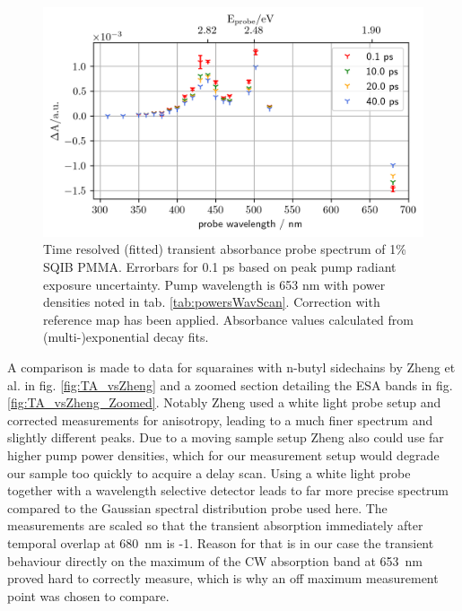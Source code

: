 \documentclass[twoside,openright]{scrreprt}
\begin{document}
\begin{figure}[hbt]
\centering
\includegraphics[scale=1]{images/TimeResolvedWavelengthScanSQIB1perc_PMMA_mapCorrected.png}
\caption{Time resolved (fitted) transient absorbance probe spectrum of 1\% SQIB PMMA. Errorbars for 0.1 ps based on peak pump radiant exposure uncertainty. Pump wavelength is 653 nm with power densities noted in tab. \ref{tab:powersWavScan}. Correction with reference map has been applied. Absorbance values calculated from (multi-)exponential decay fits.\label{fig:SQIB_PMMAwavelengthscan}}
\end{figure}

A comparison is made to data for squaraines with n-butyl sidechains by Zheng et al.\cite{Zheng2020} in fig. \ref{fig:TA_vsZheng} and a zoomed section detailing the ESA bands in fig. \ref{fig:TA_vsZheng_Zoomed}. Notably Zheng used a white light probe setup and corrected measurements for anisotropy, leading to a much finer spectrum and slightly different peaks. Due to a moving sample setup Zheng also could use far higher pump power densities, which for our measurement setup would degrade our sample too quickly to acquire a delay scan. Using a white light probe together with a wavelength selective detector leads to far more precise spectrum compared to the Gaussian spectral distribution probe used here. The measurements are scaled so that the transient absorption immediately after temporal overlap at \SI{680}{\nano\meter} is -1. Reason for that is in our case the transient behaviour directly on the maximum of the CW absorption band at \SI{653}{\nano\meter} proved hard to correctly measure, which is why an off maximum measurement point was chosen to compare.%
\end{document}
